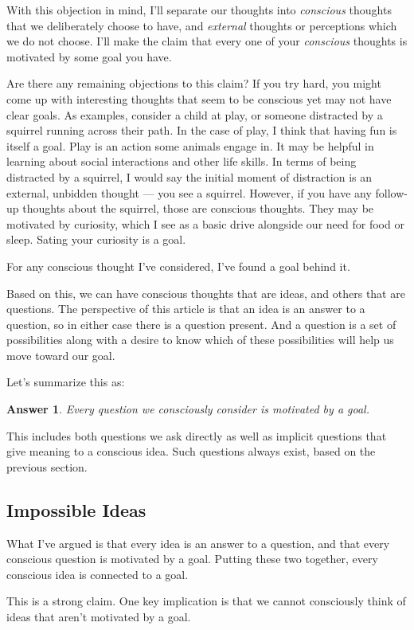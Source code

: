 \documentclass[11pt, oneside]{article}
\newtheorem*{answer}{Answer}
\theoremstyle{argtstyle}
\begin{document}
With this objection in mind, I'll separate our thoughts into
{\em conscious} thoughts that we deliberately choose to have,
and {\em external} thoughts or perceptions which we do not choose.
I'll make the claim that every one of your {\em conscious}
thoughts
is motivated by some goal you have.

Are there any remaining objections to this claim?
If you try hard, you might come up with interesting 
thoughts that seem to be conscious yet may not have
clear goals. As examples, consider a child at play, or
someone distracted by a squirrel running across their path.
In the case of play, I think that having fun is itself a goal.
Play is an action some animals engage in.
It may be helpful in learning about social interactions and
other life skills.
In terms of being distracted by a squirrel,
I would say the initial moment of distraction is an
external, unbidden thought --- you see a squirrel. However,
if you have any follow-up thoughts about the squirrel, those
are conscious thoughts. They may be motivated by
curiosity, which I see as a basic drive alongside
our need for food or sleep.
Sating your curiosity is a goal.

For any conscious thought I've considered, I've
found a goal behind it.

Based on this, we can have conscious thoughts that are ideas, and others that
are questions. The perspective of this article is that an idea is an answer to a
question, so in either case there is a question present. And a question is a set
of possibilities along with a desire to know which of these possibilities will
help us move toward our goal.

Let's summarize this as:
\begin{answer}
    Every question we consciously consider is motivated by a goal.
\end{answer}
This includes both questions we ask directly as well as
implicit questions that give meaning to a conscious idea.
Such questions always exist, based on the previous
section.

\subsection{Impossible Ideas}

What I've argued is that every idea is an answer to a question, and that every
conscious question is motivated by a goal. Putting these two together,
every
conscious idea is connected to a goal.

This is a strong claim. One key implication is that we cannot consciously
think of ideas that aren't motivated by a goal.
\end{document}
